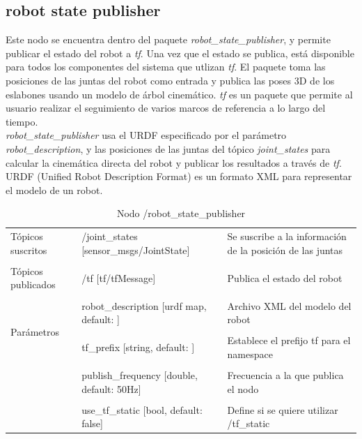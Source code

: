 \documentclass[a4paper,usenames,dvipsnames,svgnames,table]{book}
\begin{document}
\subsection{robot state publisher}
Este nodo se encuentra dentro del paquete \textit{robot\_state\_publisher}, y permite publicar el estado del robot a \textit{tf}. Una vez que el estado se publica, está disponible para todos los componentes del sistema que utlizan \textit{tf}. El paquete toma las posiciones de las juntas del robot como entrada y publica las poses 3D de los eslabones usando un modelo de árbol cinemático. \textit{tf} es un paquete que permite al usuario realizar el seguimiento de varios marcos de referencia a lo largo del tiempo.\\

\textit{robot\_state\_publisher} usa el URDF especificado por el parámetro \textit{robot\_description}, y las posiciones de las juntas del tópico \textit{joint\_states} para calcular la cinemática directa del robot y publicar los resultados a través de \textit{tf}. URDF (Unified Robot Description Format) es un formato  XML para representar el modelo de un robot.

\begin{table}[H]
\begin{center}
\begin{tabular}{|l|l|p{4cm}|}%
\hline

Tópicos suscritos &  /joint\_states [sensor\_msgs/JointState] & Se suscribe a la información de la posición de las juntas \\ 
& & \\
\hline

Tópicos publicados &  /tf [tf/tfMessage] & Publica el estado del robot \\
& & \\
\hline

\multirow{4}{*}{Parámetros} 
&  robot\_description [urdf map, default: ] & Archivo XML del modelo del robot \\
& & \\
& tf\_prefix [string, default: ]  & Establece el prefijo tf para el namespace\\
& & \\
& publish\_frequency [double, default: 50Hz] & Frecuencia a la que publica el nodo\\
& & \\
& use\_tf\_static [bool, default: false]  & Define si se quiere utilizar /tf\_static\\
\cline{1-3}

\end{tabular}
\caption{Nodo /robot\_state\_publisher}
\label{robot state publisher node}
\end{center}
\end{table}
\end{document}
